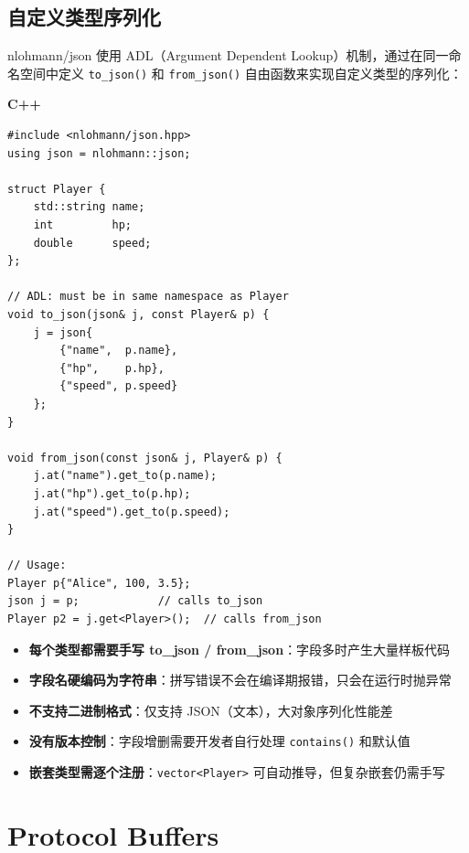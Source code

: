 \documentclass[12pt,a4paper,fontset=fandol]{ctexbook}
\newcommand{\Fn}[1]{\texttt{#1()}}
\newcommand{\Tp}[1]{\texttt{#1}}
\newcommand{\cpplabel}{%
  \noindent\begin{tcolorbox}[colback=algheadbg,coltext=white,
    sharp corners,boxrule=0pt,width=3.0em,height=1.4em,
    halign=center,valign=center,nobeforeafter,left=0pt,right=0pt,
    top=0pt,bottom=0pt]\small\bfseries C++\end{tcolorbox}}
\begin{document}
\section{自定义类型序列化}\label{sec:json-adl}

nlohmann/json 使用 ADL（Argument Dependent Lookup）机制，通过在同一命名空间中定义 \Fn{to\_json} 和 \Fn{from\_json} 自由函数来实现自定义类型的序列化：

\cpplabel
\begin{lstlisting}[caption={nlohmann/json: 自定义类型序列化}]
#include <nlohmann/json.hpp>
using json = nlohmann::json;

struct Player {
    std::string name;
    int         hp;
    double      speed;
};

// ADL: must be in same namespace as Player
void to_json(json& j, const Player& p) {
    j = json{
        {"name",  p.name},
        {"hp",    p.hp},
        {"speed", p.speed}
    };
}

void from_json(const json& j, Player& p) {
    j.at("name").get_to(p.name);
    j.at("hp").get_to(p.hp);
    j.at("speed").get_to(p.speed);
}

// Usage:
Player p{"Alice", 100, 3.5};
json j = p;            // calls to_json
Player p2 = j.get<Player>();  // calls from_json
\end{lstlisting}

\begin{warning}[title={nlohmann/json 序列化痛点}]
\begin{itemize}[nosep]
  \item \textbf{每个类型都需要手写 to\_json / from\_json}：字段多时产生大量样板代码
  \item \textbf{字段名硬编码为字符串}：拼写错误不会在编译期报错，只会在运行时抛异常
  \item \textbf{不支持二进制格式}：仅支持 JSON（文本），大对象序列化性能差
  \item \textbf{没有版本控制}：字段增删需要开发者自行处理 \Fn{contains} 和默认值
  \item \textbf{嵌套类型需逐个注册}：\Tp{vector<Player>} 可自动推导，但复杂嵌套仍需手写
\end{itemize}
\end{warning}

\chapter{Protocol Buffers}\label{ch:protobuf}
\end{document}
